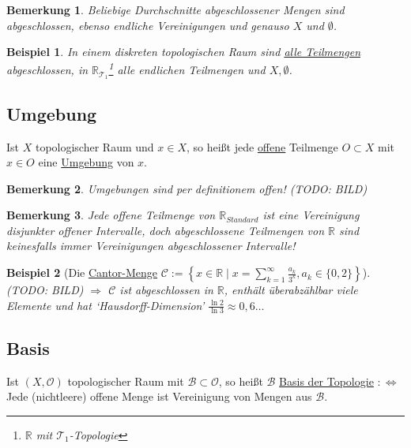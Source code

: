 \documentclass[a4paper,11pt,notitlepage]{report}
\newtheorem{definition}{Definition}[chapter]
\newtheorem{remark}{Bemerkung}[chapter]
\newtheorem{example}{Beispiel}[chapter]
\newcommand{\R}{{\ensuremath{\mathbb{R}}}}
\newcommand{\OO}{{\ensuremath{\mathcal{O}}}}
\newenvironment{Kasten}[1]
{
\hspace{0.05\linewidth}
\begin{center}
\begin{minipage}{0.9\linewidth}
\setlength{\fboxsep}{18pt}
\definecolor{shadecolor}{gray}{0.9}
\definecolor{framecolor}{gray}{0}
\def\FrameCommand{\fcolorbox{framecolor}{shadecolor}}
\MakeFramed {\FrameRestore}
\subsection{#1}
\begin{itshape}
}
{
\end{itshape}
\endMakeFramed
\end{minipage}
\end{center}
\vspace{1em}
}
\begin{document}
\begin{remark}
	Beliebige Durchschnitte abgeschlossener Mengen sind abgeschlossen, ebenso endliche Vereinigungen und genauso $X$ und $\emptyset$.
\end{remark}

\begin{example}
	In einem diskreten topologischen Raum sind \underline{alle Teilmengen} abgeschlossen, in $\R_{\mathcal{T}_1}$\footnote{$\R$ mit $\mathcal{T}_1$-Topologie} alle endlichen Teilmengen und $X, \emptyset$.
\end{example}

\begin{Kasten}{Umgebung}
	Ist $X$ topologischer Raum und $x \in X$, so heißt jede \underline{offene} Teilmenge $O \subset X$ mit $x \in O$ eine \underline{Umgebung} von $x$.
\end{Kasten}

\begin{remark}
	Umgebungen sind per definitionem offen! (TODO: BILD)
\end{remark}

\begin{remark}
	Jede offene Teilmenge von $\R_{Standard}$ ist eine Vereinigung disjunkter offener Intervalle, doch abgeschlossene Teilmengen von $\R$ sind keinesfalls immer Vereinigungen abgeschlossener Intervalle!
\end{remark}

\begin{example}[Die \underline{Cantor-Menge} $\mathcal{C}:= \left \{ x \in \R \mid x = \sum\limits_{k=1}^{\infty}{\frac{a_k}{3^k}}, a_k \in \{0,2\} \right \}$]
	(TODO: BILD)
	\newline
	$\Rightarrow$ $\mathcal{C}$ ist abgeschlossen in $\R$, enthält überabzählbar viele Elemente und hat `Hausdorff-Dimension' $\frac{\ln 2}{\ln 3} \approx 0,6 \ldots$
\end{example}

\begin{Kasten}{Basis}
	Ist $(X, \OO)$ topologischer Raum mit $\mathcal{B} \subset \OO$, so heißt $\mathcal{B}$ \underline{Basis der Topologie} $:\Leftrightarrow$ Jede (nichtleere) offene Menge ist Vereinigung von Mengen aus $\mathcal{B}$.
\end{Kasten}
\end{document}
